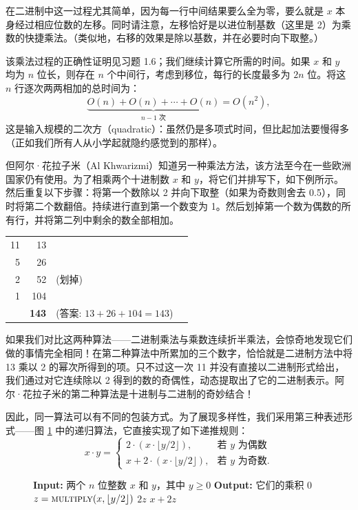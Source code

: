 在二进制中这一过程尤其简单，因为每一行中间结果要么全为零，要么就是 $x$ 本身经过相应位数的左移。同时请注意，左移恰好是以进位制基数（这里是 2）为乘数的快捷乘法。（类似地，右移的效果是除以基数，并在必要时向下取整。）

该乘法过程的正确性证明见习题 1.6；我们继续计算它所需的时间。如果 $x$ 和 $y$ 均为 $n$ 位长，则存在 $n$ 个中间行，考虑到移位，每行的长度最多为 $2n$ 位。将这 $n$ 行逐次两两相加的总时间为：
\[
\underbrace{O(n) + O(n) + \cdots + O(n)}_{n-1 \text{ 次}} = O(n^2),
\]
这是输入规模的二次方（quadratic）：虽然仍是多项式时间，但比起加法要慢得多（正如我们所有人从小学起就隐约感觉到的那样）。

但阿尔·花拉子米（Al Khwarizmi）知道另一种乘法方法，该方法至今在一些欧洲国家仍有使用。为了相乘两个十进制数 $x$ 和 $y$，将它们并排写下，如下例所示。然后重复以下步骤：将第一个数除以 2 并向下取整（如果为奇数则舍去 0.5），同时将第二个数翻倍。持续进行直到第一个数变为 1。然后划掉第一个数为偶数的所有行，并将第二列中剩余的数全部相加。

\begin{center}
\begin{tabular}{rrll}
11 & 13 & & \\
5 & 26 & & \\
2 & 52 & (划掉) & \\
1 & 104 & & \\
\hline
& \textbf{143} & (答案: $13 + 26 + 104 = 143$) &
\end{tabular}
\end{center}

如果我们对比这两种算法——二进制乘法与乘数连续折半乘法，会惊奇地发现它们做的事情完全相同！在第二种算法中所累加的三个数字，恰恰就是二进制方法中将 13 乘以 2 的幂次所得到的项。只不过这一次 11 并没有直接以二进制形式给出，我们通过对它连续除以 2 得到的数的奇偶性，动态提取出了它的二进制表示。阿尔·花拉子米的第二种算法是十进制与二进制的奇妙结合！

因此，同一算法可以有不同的包装方式。为了展现多样性，我们采用第三种表述形式——图 \ref{fig:mult_recursive} 中的递归算法，它直接实现了如下递推规则：
\[
x \cdot y = \begin{cases}
2 \cdot (x \cdot \lfloor y / 2 \rfloor), & \text{若 } y \text{ 为偶数} \\
x + 2 \cdot (x \cdot \lfloor y / 2 \rfloor), & \text{若 } y \text{ 为奇数}.
\end{cases}
\]

\begin{figure}[htbp]
\centering
\begin{tcolorbox}[colback=white,colframe=gray!50!black,title={\textbf{图 1.1}\quad 法式乘法 (Multiplication à la Française)}]
\begin{algorithmic}[1]
    \State \textbf{Input:} 两个 $n$ 位整数 $x$ 和 $y$，其中 $y \ge 0$
    \State \textbf{Output:} 它们的乘积
     \Return $0$ \EndIf
    \State $z = \Call{multiply}{x, \lfloor y/2 \rfloor}$
        \State \Return $2z$
    \Else
        \State \Return $x + 2z$
    \EndIf
\EndFunction
\end{algorithmic}
\end{tcolorbox}
\label{fig:mult_recursive}
\end{figure}

